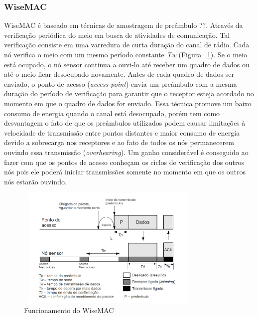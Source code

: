  \subsubsection{WiseMAC}
 
 WiseMAC \cite{El-Hoiydi2004} é baseado em técnicas de amostragem de preâmbulo \cite{El-Hoiydi2002}??. Através da verificação periódica do meio em busca de atividades de comunicação. Tal verificação consiste em uma varredura de curta duração do canal de rádio. Cada nó verifica o meio com um mesmo período constante \textit{Tw} (Figura ~\ref{fig:wisemac}). Se o meio está ocupado, o nó sensor continua a ouvi-lo até receber um quadro de dados ou até o meio ficar desocupado novamente. Antes de cada quadro de dados ser enviado, o ponto de acesso (\textit{access point}) envia um preâmbulo com a mesma duração do período de verificação para garantir que o receptor esteja acordado no momento em que o quadro de dados for enviado. Essa técnica promove um baixo consumo de energia quando o canal está desocupado, porém tem como desvantagem o fato de que os preâmbulos utilizados podem causar limitações à velocidade de transmissão entre pontos distantes e maior consumo de energia devido a sobrecarga nos receptores e ao fato de todos os nós permanecerem ouvindo essa transmissão (\textit{overhearing}). Um ganho considerável é conseguido ao fazer com que os pontos de acesso conheçam os ciclos de verificação dos outros nós pois ele poderá iniciar transmissões somente no momento em que os outros nós estarão ouvindo.
 
\begin{figure}[!htb]
\centering
\includegraphics[width=340px,height=220px]{./Pictures/wisemac.png}
\caption{Funcionamento do WiseMAC \cite{El-Hoiydi2004}} %
\label{fig:wisemac} %
\end{figure}

